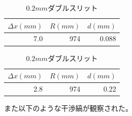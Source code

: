 \documentclass[11pt, a4paper]{jsarticle}
\begin{document}
\begin{table}[htb]
 \begin{minipage}{0.45\hsize}
  \begin{center}
    \caption{$0.1mm$ダブルスリット}
    \begin{tabular}{rrr} \hline
        $\Delta x(mm)$ & $R(mm)$ & $d(mm)$  \\ \hline
        7.0    & 974 & 0.088\\ \hline
    \end{tabular}
    \label{tab:f}
  \end{center}
 \end{minipage}
 \begin{minipage}{0.45\hsize}
  \begin{center}
    \caption{$0.2mm$ダブルスリット}
    \begin{tabular}{rrr} \hline
        $\Delta x(mm)$ & $R(mm)$ & $d(mm)$  \\ \hline
        2.8    & 974 & 0.22\\ \hline
    \end{tabular}
    \label{tab:g}
  \end{center}
 \end{minipage}
\end{table}
\newpage
また以下のような干渉縞が観察された。
\end{document}
